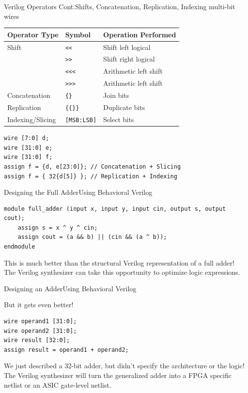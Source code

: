\documentclass{beamer}
\begin{document}
\begin{frame}[fragile]{Verilog Operators Cont.}{Shifts, Concatenation, Replication, Indexing multi-bit wires}
	\begin{center}
		\begin{tabular}{l | l | l}
			Operator Type & Symbol & Operation Performed \\ \hline
			Shift & \texttt{<<} & Shift left logical \\ \hline
			& \texttt{>>} & Shift right logical \\ \hline
			& \texttt{<<<} & Arithmetic left shift \\ \hline
			& \texttt{>>>} & Arithmetic left shift \\ \hline
			Concatenation & \texttt{\{\}} & Join bits \\ \hline
			Replication & \texttt{\{\{\}\}} & Duplicate bits \\ \hline
			Indexing/Slicing & \texttt{[MSB:LSB]} & Select bits \\ \hline
		\end{tabular}
	\end{center}
\begin{verbatim}
wire [7:0] d;
wire [31:0] e;
wire [31:0] f;
assign f = {d, e[23:0]}; // Concatenation + Slicing
assign f = { 32{d[5]} }; // Replication + Indexing
\end{verbatim}
\end{frame}

\begin{frame}[fragile]{Designing the Full Adder}{Using Behavioral Verilog}
\begin{verbatim}
module full_adder (input x, input y, input cin, output s, output cout);
	assign s = x ^ y ^ cin;
	assign cout = (a && b) || (cin && (a ^ b));
endmodule
\end{verbatim}
This is much better than the structural Verilog representation of a full adder! The Verilog synthesizer can take this opportunity to optimize logic expressions.
\end{frame}

\begin{frame}[fragile]{Designing an Adder}{Using Behavioral Verilog}

But it gets even better!

\begin{verbatim}
wire operand1 [31:0];
wire operand2 [31:0];
wire result [32:0];
assign result = operand1 + operand2;
\end{verbatim}

We just described a 32-bit adder, but didn't specify the architecture or the logic! The Verilog synthesizer will turn the generalized adder into a FPGA specific netlist or an ASIC gate-level netlist.
\end{frame}
\end{document}
